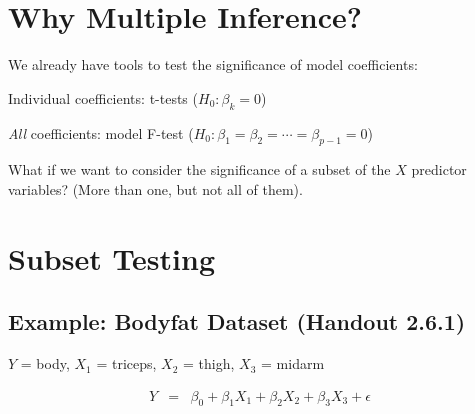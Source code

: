 \documentclass[12pt]{notes}
\begin{document}

\section{Why Multiple Inference?}

We already have tools to test the significance of model coefficients:
\bi
\item Individual coefficients: t-tests ($H_0: \beta_k = 0$)
\item \textit{All} coefficients: model F-test ($H_0: \beta_1 = \beta_2 = \cdots = \beta_{p-1} = 0$)
\ei

\nspace
What if we want to consider the significance of a subset of the $X$ predictor variables? (More than one, but not all of them). 


\begin{minipage}[l][2cm][c]{\textwidth}
\begin{comment}
\end{comment}
\end{minipage}

\section{Subset Testing} 

\subsection*{Example: Bodyfat Dataset (Handout 2.6.1)}
$Y$ = body, $X_1$ = triceps, $X_2$ = thigh, $X_3$ = midarm

\vspace{-1em}

\begin{eqnarray}
  Y & = & \beta_0 + \beta_1 X_1 + \beta_2 X_2 + \beta_3 X_3 + \epsilon \nonumber
\end{eqnarray}


\begin{minipage}[l][2cm][c]{\textwidth}
\begin{comment}
\end{comment}
\end{minipage}
\end{document}
